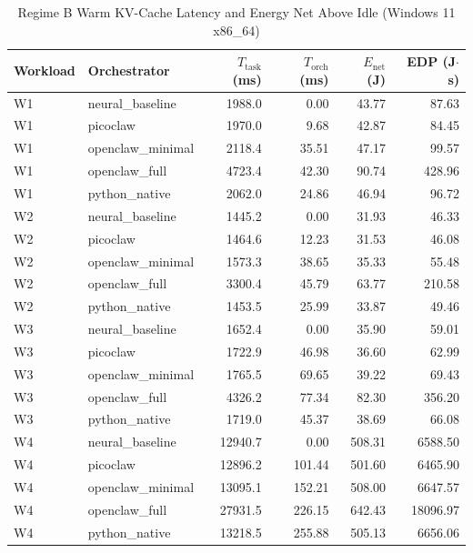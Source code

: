 \begin{table}[t]
\centering\small
\caption{Regime B Warm KV-Cache Latency and Energy Net Above Idle (Windows 11 x86_64)}
\label{tab:Windows_warm_cache}
\begin{tabular}{llrrrr}
\toprule
Workload & Orchestrator & $T_{\text{task}}$ (ms) & $T_{\text{orch}}$ (ms) & $E_{\text{net}}$ (J) & EDP (J$\cdot$s) \\
\midrule
W1 & neural\_baseline & 1988.0 & 0.00 & 43.77 & 87.63 \\
W1 & picoclaw & 1970.0 & 9.68 & 42.87 & 84.45 \\
W1 & openclaw\_minimal & 2118.4 & 35.51 & 47.17 & 99.57 \\
W1 & openclaw\_full & 4723.4 & 42.30 & 90.74 & 428.96 \\
W1 & python\_native & 2062.0 & 24.86 & 46.94 & 96.72 \\
W2 & neural\_baseline & 1445.2 & 0.00 & 31.93 & 46.33 \\
W2 & picoclaw & 1464.6 & 12.23 & 31.53 & 46.08 \\
W2 & openclaw\_minimal & 1573.3 & 38.65 & 35.33 & 55.48 \\
W2 & openclaw\_full & 3300.4 & 45.79 & 63.77 & 210.58 \\
W2 & python\_native & 1453.5 & 25.99 & 33.87 & 49.46 \\
W3 & neural\_baseline & 1652.4 & 0.00 & 35.90 & 59.01 \\
W3 & picoclaw & 1722.9 & 46.98 & 36.60 & 62.99 \\
W3 & openclaw\_minimal & 1765.5 & 69.65 & 39.22 & 69.43 \\
W3 & openclaw\_full & 4326.2 & 77.34 & 82.30 & 356.20 \\
W3 & python\_native & 1719.0 & 45.37 & 38.69 & 66.08 \\
W4 & neural\_baseline & 12940.7 & 0.00 & 508.31 & 6588.50 \\
W4 & picoclaw & 12896.2 & 101.44 & 501.60 & 6465.90 \\
W4 & openclaw\_minimal & 13095.1 & 152.21 & 508.00 & 6647.57 \\
W4 & openclaw\_full & 27931.5 & 226.15 & 642.43 & 18096.97 \\
W4 & python\_native & 13218.5 & 255.88 & 505.13 & 6656.06 \\
\bottomrule
\end{tabular}
\end{table}
